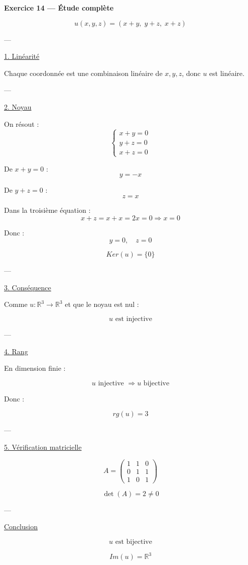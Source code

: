 \documentclass[11pt,a4paper]{article}
\begin{document}
\textbf{Exercice 14 — Étude complète}

\[
u(x,y,z) = (x+y,\; y+z,\; x+z)
\]

---

\underline{1. Linéarité}

Chaque coordonnée est une combinaison linéaire de $x,y,z$, donc $u$ est linéaire.

---

\underline{2. Noyau}

On résout :
\[
\begin{cases}
x+y=0 \\
y+z=0 \\
x+z=0
\end{cases}
\]

De $x+y=0$ :
\[
y=-x
\]

De $y+z=0$ :
\[
z=x
\]

Dans la troisième équation :
\[
x+z = x+x = 2x = 0 \Rightarrow x=0
\]

Donc :
\[
y=0,\quad z=0
\]

\[
\boxed{Ker(u)=\{0\}}
\]

---

\underline{3. Conséquence}

Comme $u : \mathbb{R}^3 \to \mathbb{R}^3$ et que le noyau est nul :

\[
\boxed{u \text{ est injective}}
\]

---

\underline{4. Rang}

En dimension finie :

\[
\boxed{u \text{ injective } \Rightarrow u \text{ bijective}}
\]

Donc :

\[
\boxed{rg(u)=3}
\]

---

\underline{5. Vérification matricielle}

\[
A =
\begin{pmatrix}
1 & 1 & 0 \\
0 & 1 & 1 \\
1 & 0 & 1
\end{pmatrix}
\]

\[
\det(A) = 2 \neq 0
\]

---

\underline{Conclusion}

\[
\boxed{u \text{ est bijective}}
\]

\[
Im(u)=\mathbb{R}^3
\]
\end{document}
